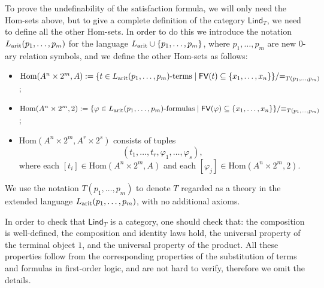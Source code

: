 \begin{remark}
    To prove the undefinability of the satisfaction formula, we will only need the Hom-sets above, but to give a complete definition of the category $\mathsf{Lind}_T$, we need to define all the other Hom-sets.
    In order to do this we introduce the notation $L_{\textnormal{arit}}(p_1,\ldots,p_m)$ for the language $L_{\textnormal{arit}} \cup \{p_1,\ldots,p_m\}$, where $p_1,\ldots,p_m$ are new 0-ary relation symbols, and we define the other Hom-sets as follows:
    \begin{itemize}[leftmargin=-1.8pt]
        \item $\mathrm{Hom}(A^n \times 2^m,A) := \{t \in L_{\textnormal{arit}}(p_1,\ldots,p_m)\textnormal{-terms} \mid \textsf{FV}(t)\subseteq\{x_1,\ldots,x_n\}\}/{=_{T(p_1,\ldots,p_m)}}$;
        \item $\mathrm{Hom}(A^n \times 2^m,2) := \{\varphi \in L_{\textnormal{arit}}(p_1,\ldots,p_m)\textnormal{-formulas} \mid \textsf{FV}(\varphi)\subseteq\{x_1,\ldots,x_n\}\}/{\equiv_{T(p_1,\ldots,p_m)}}$;
        \item $\mathrm{Hom}(A^n \times 2^m,A^r \times 2^s)$ consists of tuples
        \[ (t_1,\ldots,t_r,\varphi_1,\ldots,\varphi_s), \]
        where each $[t_i]\in\mathrm{Hom}(A^n\times2^m,A)$ and each $[\varphi_j]\in\mathrm{Hom}(A^n\times2^m,2)$.
    \end{itemize}
    We use the notation $T(p_1,\ldots,p_m)$ to denote $T$ regarded as a theory in the extended language $L_{\textnormal{arit}}(p_1,\ldots,p_m)$, with no additional axioms.
\end{remark}

\begin{remark}
    In order to check that $\mathsf{Lind}_T$ is a category, one should check that: the composition is well-defined, the composition and identity laws hold,
    the universal property of the terminal object $1$, and the universal property of the product. All these properties follow from the corresponding properties of the substitution of terms and formulas in first-order logic,
    and are not hard to verify, therefore we omit the details.
\end{remark}

